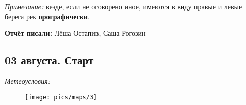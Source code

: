 \textit{Примечание:} везде, если не оговорено иное, имеются в виду правые и левые берега рек \textbf{орографически}.

\textbf{Отчёт писали:} Лёша Остапив, Саша Рогозин
\subsection{03 августа. Старт}
\textit{Метеоусловия: }

\begin{figure}[h!]
	\centering
	\texttt{[image: pics/maps/3]}
	\label{fig:mini_18}
\end{figure}



\clearpage